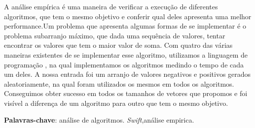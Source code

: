 \documentclass[
	12pt,				%
	oneside,   	        %
	a4paper,			%
	english,			%
	french,				%
	spanish,			%
	brazil,				%
	]{pacotes/abntex2}
\begin{document}
\frenchspacing 



\imprimirfolhaderosto



\begin{resumo}
A análise empírica é uma maneira de verificar a execução de diferentes algoritmos, que tem o mesmo objetivo e conferir qual deles apresenta uma melhor performance.Um problema que apresenta algumas formas de se implementar é o problema subarranjo máximo, que dada uma sequência de valores, tentar encontrar os valores que tem o maior valor de soma. Com quatro das várias maneiras existentes de se implementar esse algoritmo, utilizamos a linguagem de programação , na qual implementamos os algoritmos medindo o tempo de cada um deles. A nossa entrada foi um arranjo de valores negativos e positivos gerados aleatoriamente, na qual foram utilizados os mesmos em todos os algoritmos. Conseguimos obter sucesso em todos os tamanhos de vetores que propomos e foi visível a diferença de um algoritmo para outro que tem o mesmo objetivo.

\vspace{\onelineskip}
    
 \noindent
\textbf{Palavras-chave}: análise de algoritmos. \textit{Swift},análise empirica.
\end{resumo}



\end{document}
